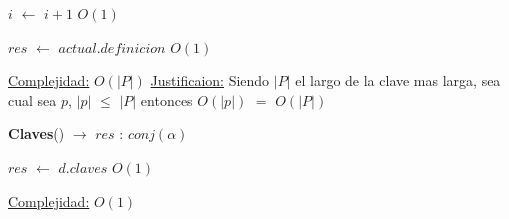 \begin{Algoritmos}
\begin{algorithm}[H]
\begin{algorithmic}[1]
	\State $i$ $\gets$ $i + 1$ \Comment $O(1)$
\EndWhile 


\State $res$ $\gets$ $actual$.$definicion$ \Comment $O(1)$ 

\medskip
\State \underline{Complejidad:} $O(|P|)$
\State \underline{Justificaion:} Siendo $|P|$ el largo de la clave mas larga, sea cual sea $p$, $|p|$ $\leq$ $|P|$ entonces 	$O(|p|)$ $=$ $O(|P|)$

\end{algorithmic}
\end{algorithm}
  
\begin{algorithm}[H]
{\textbf{Claves}(}) $\to$ $res$ : $conj(\alpha)$
\begin{algorithmic}[1]

\State $res$ $\gets$ $d.claves$ \Comment $O(1)$

\medskip
\State \underline{Complejidad:} $O(1)$

\end{algorithmic}
\end{algorithm}
  
  
\end{Algoritmos}

